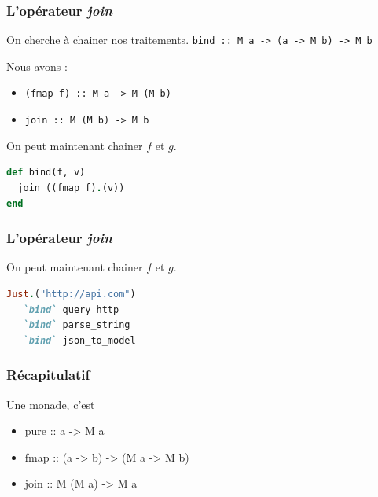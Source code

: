 \documentclass{beamer}
\begin{document}
\begin{frame}[fragile]
\frametitle{L'opérateur \emph{join}}
\begin{block}{On cherche à chainer nos traitements.}
\verb!bind :: M a -> (a -> M b) -> M b!
\end{block}

\pause

\begin{block}{Nous avons :}
\begin{itemize}
\item \verb!(fmap f) :: M a -> M (M b)!
\item \verb!join :: M (M b) -> M b!
\end{itemize}
\end{block}
\pause

\begin{block}{On peut maintenant chainer $f$ et $g$.}
\begin{lstlisting}[language=ruby]
def bind(f, v)
  join ((fmap f).(v))
end
\end{lstlisting}
\end{block}
\end{frame}

\begin{frame}[fragile]
\frametitle{L'opérateur \emph{join}}

\begin{block}{On peut maintenant chainer $f$ et $g$.}
\begin{lstlisting}[language=ruby]
Just.("http://api.com")
   `bind` query_http
   `bind` parse_string
   `bind` json_to_model
\end{lstlisting}
\end{block}
\end{frame}

\begin{frame}
\frametitle{Récapitulatif}

\begin{block}{Une monade, c'est}

	\begin{itemize}
		\item pure :: a -> M a
		\item fmap :: (a -> b) -> (M a -> M b)
		\item join :: M (M a) -> M a
	\end{itemize}

\end{block}

\end{frame}
\end{document}
